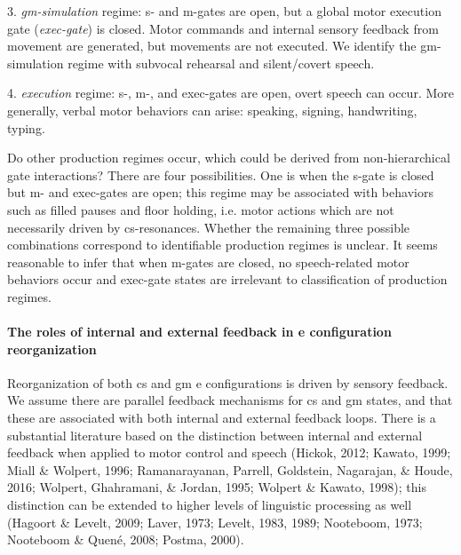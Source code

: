 3. \textit{gm-simulation} regime: s- and m-gates are open,  but a global motor execution gate (\textit{exec-gate}) is closed. Motor commands and internal sensory feedback from movement are generated, but movements are not executed. We identify the gm-simulation regime with subvocal rehearsal and silent/covert speech. 

4. \textit{execution} regime: s-, m-, and exec-gates are open, overt speech can occur. More generally, verbal motor behaviors can arise: speaking, signing, handwriting, typing.

  Do other production regimes occur, which could  be derived from non-hierarchical gate interactions? There are four possibilities. One is when the s-gate is closed but m- and exec-gates are open; this regime may be associated with behaviors such as filled pauses and floor holding, i.e. motor actions which are not necessarily driven by cs-resonances. Whether the remaining three possible combinations correspond to identifiable production regimes is unclear. It seems reasonable to infer that when m-gates are closed, no speech-related motor behaviors occur and exec-gate states are irrelevant to classification of production regimes.

\paragraph{The roles of internal and external feedback in e configuration reorganization}

Reorganization of both cs and gm e configurations is driven by sensory feedback. We assume there are parallel feedback mechanisms for cs and gm states, and that these are associated with both internal and external feedback loops. There is a substantial literature based on the distinction between internal and external feedback when applied to motor control and speech (Hickok, 2012; Kawato, 1999; Miall \& Wolpert, 1996; Ramanarayanan, Parrell, Goldstein, Nagarajan, \& Houde, 2016; Wolpert, Ghahramani, \& Jordan, 1995; Wolpert \& Kawato, 1998); this distinction can be extended to higher levels of linguistic processing as well (Hagoort \& Levelt, 2009; Laver, 1973; Levelt, 1983, 1989; Nooteboom, 1973; Nooteboom \& Quené, 2008; Postma, 2000).


